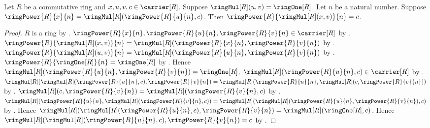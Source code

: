 \begin{theorem}\label{commutative_ring_power_after_multiplying_inverse}
    Let $R$ be a commutative ring and $x,u,v,c\in\carrier[R]$.
    Suppose $\ringMul[R](u,v)=\ringOne[R]$.
    Let $n$ be a natural number.
    Suppose $\ringPower{R}{x}{n}
        =\ringMul[R](\ringPower{R}{u}{n},c)$.
    Then $\ringPower{R}{\ringMul[R](x,v)}{n}=c$.
\end{theorem}
\begin{proof}
    $R$ is a ring by .
    $\ringPower{R}{x}{n},\ringPower{R}{u}{n},
        \ringPower{R}{v}{n}\in\carrier[R]$ by
        .
    $\ringPower{R}{\ringMul[R](x,v)}{n}
        =\ringMul[R](\ringPower{R}{x}{n},\ringPower{R}{v}{n})$ by
        .
    $\ringPower{R}{\ringMul[R](u,v)}{n}
        =\ringMul[R](\ringPower{R}{u}{n},\ringPower{R}{v}{n})$ by
        .
    $\ringPower{R}{\ringOne[R]}{n}=\ringOne[R]$ by
        .
    Hence $\ringMul[R](\ringPower{R}{u}{n},\ringPower{R}{v}{n})
        =\ringOne[R]$.
    $\ringMul[R](\ringPower{R}{u}{n},c)
        \in\carrier[R]$ by .
    $\ringMul[R](\ringMul[R](\ringPower{R}{u}{n},c),
            \ringPower{R}{v}{n})
        =\ringMul[R](\ringPower{R}{u}{n},
            \ringMul[R](c,\ringPower{R}{v}{n}))$ by
        .
    $\ringMul[R](c,\ringPower{R}{v}{n})
        =\ringMul[R](\ringPower{R}{v}{n},c)$ by
        .
    $\ringMul[R](\ringPower{R}{u}{n},
            \ringMul[R](\ringPower{R}{v}{n},c))
        =\ringMul[R](
            \ringMul[R](\ringPower{R}{u}{n},\ringPower{R}{v}{n}),c)$ by
        .
    Hence $\ringMul[R](\ringMul[R](\ringPower{R}{u}{n},c),
            \ringPower{R}{v}{n})
        =\ringMul[R](\ringOne[R],c)$.
    Hence $\ringMul[R](\ringMul[R](\ringPower{R}{u}{n},c),
            \ringPower{R}{v}{n})=c$ by
        .
\end{proof}
